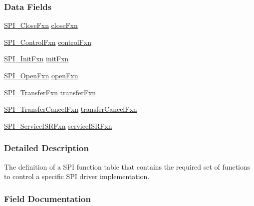 \subsubsection*{Data Fields}
\begin{DoxyCompactItemize}
\item 
\hyperlink{_s_p_i_8h_a00416f189f122a27ca351da651dbfbd5}{S\-P\-I\-\_\-\-Close\-Fxn} \hyperlink{struct_s_p_i___fxn_table_a4cfaf232f1b8c27f570a7e48f31cdffd}{close\-Fxn}
\item 
\hyperlink{_s_p_i_8h_a0796d80d841b833b08743785646288af}{S\-P\-I\-\_\-\-Control\-Fxn} \hyperlink{struct_s_p_i___fxn_table_a8823765c2e1d303e18da6bec1a432210}{control\-Fxn}
\item 
\hyperlink{_s_p_i_8h_ab316f5bfe00febe920ebe27021f47916}{S\-P\-I\-\_\-\-Init\-Fxn} \hyperlink{struct_s_p_i___fxn_table_aa4a0b45347320aed418d45cdb6609664}{init\-Fxn}
\item 
\hyperlink{_s_p_i_8h_a4968bfeca9b1f3713355a78e88679570}{S\-P\-I\-\_\-\-Open\-Fxn} \hyperlink{struct_s_p_i___fxn_table_a938876d892f41db4a3837f93e1ef04c0}{open\-Fxn}
\item 
\hyperlink{_s_p_i_8h_a0c46374ffaa3d81ded9c8da17e16b861}{S\-P\-I\-\_\-\-Transfer\-Fxn} \hyperlink{struct_s_p_i___fxn_table_ae4294e8e6273b581459432386439ca88}{transfer\-Fxn}
\item 
\hyperlink{_s_p_i_8h_a7e33c3913abdf78efc0ca606850a421b}{S\-P\-I\-\_\-\-Transfer\-Cancel\-Fxn} \hyperlink{struct_s_p_i___fxn_table_a50f7f21536780c912dedf32c0918034c}{transfer\-Cancel\-Fxn}
\item 
\hyperlink{_s_p_i_8h_a382ab11d58280f1c1de4d0dbc632e3c3}{S\-P\-I\-\_\-\-Service\-I\-S\-R\-Fxn} \hyperlink{struct_s_p_i___fxn_table_a258c209814c001c5033463a2cb9cb9dd}{service\-I\-S\-R\-Fxn}
\end{DoxyCompactItemize}


\subsubsection{Detailed Description}
The definition of a S\-P\-I function table that contains the required set of functions to control a specific S\-P\-I driver implementation. 

\subsubsection{Field Documentation}
